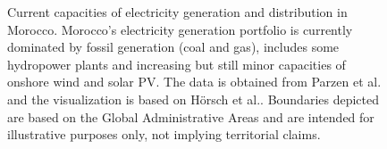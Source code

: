 \documentclass[5p,numafflabel]{elsarticle}
\begin{document}
\begin{figure}[h!]
    \centering
    \caption{Current capacities of electricity generation and distribution in Morocco. Morocco's electricity generation portfolio is currently dominated by fossil generation (coal and gas), includes some hydropower plants and increasing but still minor capacities of onshore wind and solar PV. The data is obtained from Parzen et al.\cite{Parzen2023} and the visualization is based on H\"orsch et al.\cite{Horsch2018}. Boundaries depicted are based on the Global Administrative Areas\cite{gadm2022} and are intended for illustrative purposes only, not implying territorial claims.
    }
    \label{fig:MAR_brownfield}
\end{figure}
\end{document}
